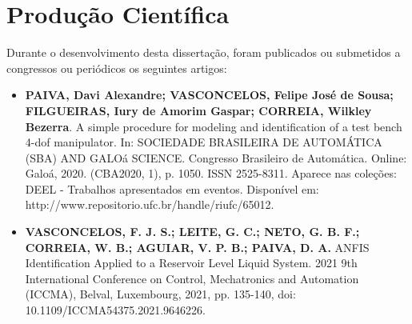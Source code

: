 \section{Produção Científica}
Durante o desenvolvimento desta dissertação, foram publicados ou submetidos a congressos ou periódicos os seguintes artigos:

\begin{itemize}
    \item \textbf{PAIVA, Davi Alexandre; VASCONCELOS, Felipe José de Sousa; FILGUEIRAS, Iury de Amorim Gaspar; CORREIA, Wilkley Bezerra}. A simple procedure for modeling and identification of a test bench 4-dof manipulator. In: SOCIEDADE BRASILEIRA DE AUTOMÁTICA (SBA) AND GALOá SCIENCE.
    Congresso Brasileiro de Automática. Online: Galoá, 2020. (CBA2020, 1), p. 1050. ISSN
    2525-8311. Aparece nas coleções: DEEL - Trabalhos apresentados em eventos. Disponível em:
    http://www.repositorio.ufc.br/handle/riufc/65012.
    \cite{paiva2020}

    \item \textbf{VASCONCELOS, F. J. S.; LEITE, G. C.; NETO, G. B. F.; CORREIA, W. B.; AGUIAR, V. P. B.; PAIVA, D. A.} ANFIS Identification Applied to a Reservoir Level Liquid System. 2021 9th International Conference on Control, Mechatronics and Automation (ICCMA), Belval, Luxembourg, 2021, pp. 135-140, doi: 10.1109/ICCMA54375.2021.9646226.
    \cite{vasconcelos2021}
\end{itemize}



